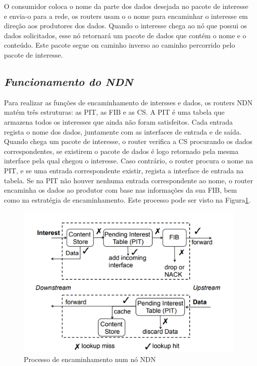 O consumidor coloca o nome da parte dos dados desejada no pacote de interesse e envia-o para a rede, os routers usam o o nome para encaminhar o interesse em direção aos produtores dos dados. Quando o interesse chega ao nó que possui os dados solicitados, esse nó retornará um pacote de dados que contém o nome e o conteúdo. Este pacote segue on caminho inverso ao caminho percorrido pelo pacote de interesse.

\subsection{\emph{Funcionamento do \gls{NDN}}}
\label{sub:func__NDN}

Para realizar as funções de encaminhamento de intersses e dados, os routers \gls{NDN} matém três estruturas: as \gls{PIT}, as \gls{FIB} e as \gls{CS}.
A \gls{PIT} é uma tabela que armazena todos os interesses que ainda não foram satisfeitos. Cada entrada regista o nome dos dados, juntamente com as interfaces de entrada e de saída. Quando chega um pacote de interesse, o router verifica a \gls{CS} procurando os dados correspondentes, se existirem o pacote de dados é logo retornado pela mesma interface pela qual chegou o interesse. Caso contrário, o router procura o nome na \gls{PIT}, e se uma entrada correspondente existir, regista a interface de entrada na tabela.
Se na \gls{PIT} não houver nenhuma entrada correspondente ao nome, o router encaminha os dados ao produtor com base nas informações da sua \gls{FIB}, bem como na estratégia de encaminhamento. Este processo pode ser visto na Figura\ref{fig:Forwarding}.

\begin{figure}[h]
    \centering
    \includegraphics{Chapters/Figures/fowarding.png}
    \caption{Processo de encaminhamento num nó \gls{NDN} \cite{papadopoulos_lixia_2014}}
    \label{fig:Forwarding}   
\end{figure}

